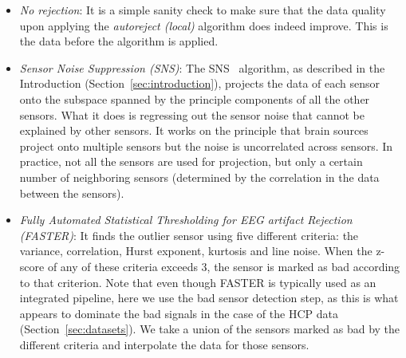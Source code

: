 \begin{itemize}[noitemsep,nolistsep]
\item \emph{No rejection}: It is a simple sanity check to make sure that the data quality upon applying the \emph{autoreject (local)} algorithm does indeed improve. This is the data before the algorithm is applied.
\item \emph{Sensor Noise Suppression (SNS)}: The SNS~\citep{de2008sensor} algorithm, as described in the Introduction (Section~\ref{sec:introduction}), projects the data of each sensor onto the subspace spanned by the principle components of all the other sensors. What it does is regressing out the sensor noise that cannot be explained by other sensors. It works on the principle that brain sources project onto multiple sensors but the noise is uncorrelated across sensors. In practice, not all the sensors are used for projection, but only a certain number of neighboring sensors (determined by the correlation in the data between the sensors).
\item \emph{Fully Automated Statistical Thresholding for EEG artifact Rejection (FASTER)}: It finds the outlier sensor using five different criteria: the variance, correlation, Hurst exponent, kurtosis and line noise. When the z-score of any of these criteria exceeds 3, the sensor is marked as bad according to that criterion. Note that even though FASTER is typically used as an integrated pipeline, here we use the bad sensor detection step, as this is what appears to dominate the bad signals in the case of the HCP data (Section~\ref{sec:datasets}). We take a union of the sensors marked as bad by the different criteria and interpolate the data for those sensors.

\end{itemize}
